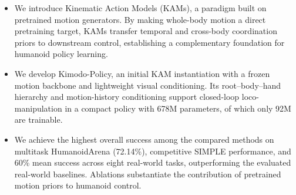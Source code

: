 \begin{samepage}
\begin{itemize}[leftmargin=*,topsep=0pt,itemsep=0.15em,parsep=0pt,partopsep=0pt]
  \item We introduce Kinematic Action Models (KAMs), a paradigm built on pretrained motion generators. By making whole-body motion a direct pretraining target, KAMs transfer temporal and cross-body coordination priors to downstream control, establishing a complementary foundation for humanoid policy learning.
  \item We develop Kimodo-Policy, an initial KAM instantiation with a frozen motion backbone and lightweight visual conditioning. Its root--body--hand hierarchy and motion-history conditioning support closed-loop loco-manipulation in a compact policy with 678M parameters, of which only 92M are trainable.
  \item We achieve the highest overall success among the compared methods on multitask HumanoidArena (72.14\%), competitive SIMPLE performance, and 60\% mean success across eight real-world tasks, outperforming the evaluated real-world baselines. Ablations substantiate the contribution of pretrained motion priors to humanoid control.
\end{itemize}
\end{samepage}
\endgroup
